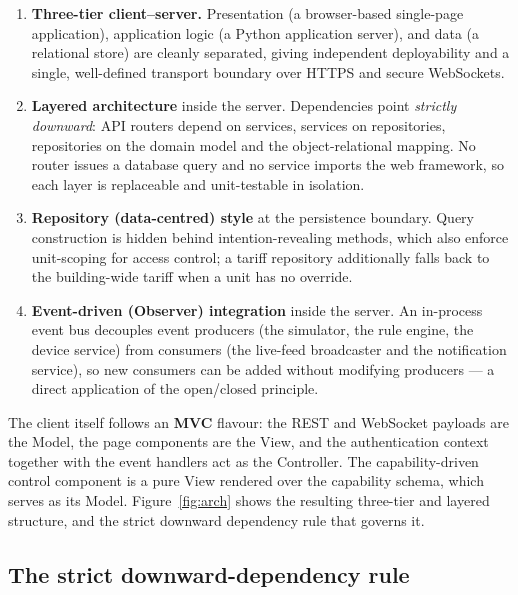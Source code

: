 \begin{enumerate}[leftmargin=1.4em]
  \item \textbf{Three-tier client--server.} Presentation (a browser-based
  single-page application), application logic (a Python application server), and data
  (a relational store) are cleanly separated, giving independent deployability and a
  single, well-defined transport boundary over HTTPS and secure WebSockets.
  \item \textbf{Layered architecture} inside the server. Dependencies point
  \emph{strictly downward}: API routers depend on services, services on
  repositories, repositories on the domain model and the object-relational mapping.
  No router issues a database query and no service imports the web framework, so each
  layer is replaceable and unit-testable in isolation.
  \item \textbf{Repository (data-centred) style} at the persistence boundary. Query
  construction is hidden behind intention-revealing methods, which also enforce
  unit-scoping for access control; a tariff repository additionally falls back to
  the building-wide tariff when a unit has no override.
  \item \textbf{Event-driven (Observer) integration} inside the server. An in-process
  event bus decouples event producers (the simulator, the rule engine, the device
  service) from consumers (the live-feed broadcaster and the notification service),
  so new consumers can be added without modifying producers --- a direct application
  of the open/closed principle.
\end{enumerate}

The client itself follows an \textbf{MVC} flavour: the REST and WebSocket payloads
are the Model, the page components are the View, and the authentication context
together with the event handlers act as the Controller. The capability-driven control
component is a pure View rendered over the capability schema, which serves as its
Model. Figure~\ref{fig:arch} shows the resulting three-tier and layered structure,
and the strict downward dependency rule that governs it.


\subsection{The strict downward-dependency rule}

